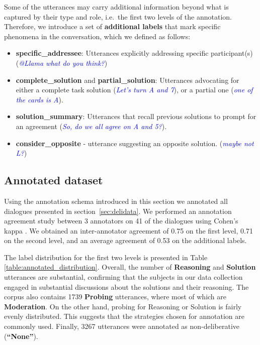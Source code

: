 \documentclass[acmsmall,manuscript,screen]{acmart}
\newcommand\example[1]{(\textcolor{blue}{\textit{#1}})}
\begin{document}
Some of the utterances may carry additional information beyond what is captured by their type and role, i.e.\ the first two levels of the annotation.
Therefore, we introduce a set of \textbf{additional labels} that mark specific phenomena in the conversation, which we defined as follows: 
\begin{itemize}[noitemsep,nolistsep]
\item \textbf{specific\_addressee}: Utterances explicitly addressing specific participant(s) \example{@Llama what do you think?}
    \item \textbf{complete\_solution} and \textbf{partial\_solution}: Utterances advocating for either a complete task solution \example{Let's turn A and 7}, or a partial one \example{one of the cards is A}. 
    
    \item \textbf{solution\_summary}: Utterances that recall previous solutions to prompt for an agreement
\example{So, do we all agree on A and 5?}.
    
    \item \textbf{consider\_opposite} - utterance suggesting an opposite solution. \example{maybe not L?}
\end{itemize}

\subsection{Annotated dataset}
Using the annotation schema introduced in this section we annotated all dialogues presented in section~\ref{sec:delidata}.
We performed an annotation agreement study between 3 annotators on 41 of the dialogues using Cohen's kappa \cite{cohen1960coefficient}. We obtained an inter-annotator agreement of 0.75 on the first level, 0.71 on the second level, and an average agreement of 0.53 on the additional labels.
\par
The label distribution for the first two levels is presented in Table~ \ref{table:annotated_distribution}. 
Overall, the number of \textbf{Reasoning} and \textbf{Solution} utterances are substantial,
confirming that the subjects in our data collection
engaged in substantial discussions about the solutions and their reasoning.
The corpus also contains 1739 \textbf{Probing} utterances, where most of which 
are \textbf{Moderation}. On the other hand, probing for Reasoning or Solution is fairly evenly distributed. This suggests that the strategies chosen for annotation are commonly used.
Finally, 3267 utterances were annotated as
non-deliberative (\textbf{``None''}).
\end{document}
